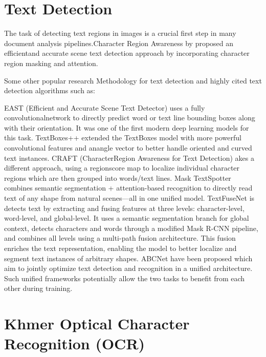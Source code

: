 \section{Text Detection}
\label{sec:text_detection_literature}

\citet{Hiremath_text_detection} The task of detecting text regions in images is a 
crucial first step in many document analysis pipelines.Character Region Awareness by \citet{Baek}
proposed an efficientand accurate scene text detection approach by incorporating character region 
masking and attention. 

\citet{Hiremath_text_detection} Some other popular research Methodology for text detection and 
highly cited text detection algorithms such as:

EAST (Efficient and Accurate Scene Text Detector) \citet{Zhou} uses a fully convolutionalnetwork to 
directly predict word or text line bounding boxes along with their orientation. 
It was one of the first modern deep learning models for this task. TextBoxes++ \citet{TextBoxes}
extended the TextBoxes model with more powerful convolutional features and anangle 
vector to better handle oriented and curved text instances.  CRAFT (CharacterRegion Awareness for 
Text Detection) \citet{Baek} akes a different approach, using a regionscore map to localize 
individual character regions which are then grouped into words/text lines.
Mask TextSpotter \citet{TextSpotter} combines semantic segmentation + attention-based 
recognition to directly read text of any shape from natural scenes—all in one unified model.
TextFuseNet \citet{ijcai2020p72} is detects text by extracting and fusing features 
at three levels: character-level, word-level, and global-level. It uses a semantic segmentation 
branch for global context, detects characters and words through a modified Mask R-CNN pipeline, 
and combines all levels using a multi-path fusion architecture. This fusion enriches the text 
representation, enabling the model to better localize and segment text instances of arbitrary shapes.
ABCNet \citet{ABCNet} have been proposed which aim to jointly optimize text detection and 
recognition in a unified architecture. Such unified frameworks potentially allow the two tasks 
to benefit from each other during training. 


\section{Khmer Optical Character Recognition (OCR)}
\label{sec:khmer_OCR_literature}


